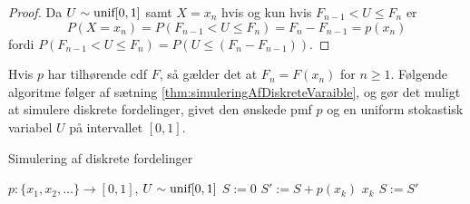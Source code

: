 \begin{proof}
    Da $U \sim \textnormal{unif}[0, 1]$ samt $X = x_n$ hvis og kun hvis $F_{n - 1} < U \leq F_n$ er
    \begin{equation*}
        P(X = x_n) = P(F_{n - 1} < U \leq F_n) = F_n - F_{n - 1} = p(x_n)
    \end{equation*}
    fordi $P(F_{n - 1} < U \leq F_n) = P\left(U \leq (F_n - F_{n - 1})\right)$.
\end{proof}

\begin{rem}
Hvis $p$ har tilhørende cdf $F$, så gælder det at $F_n = F(x_n)$ for $n \geq 1$. Følgende algoritme følger af sætning \ref{thm:simuleringAfDiskreteVaraible}, og gør det muligt at simulere diskrete fordelinger, givet den ønskede pmf $p$ og en uniform stokastisk variabel $U$ på intervallet $[0, 1]$.
\end{rem}

\begin{algorithm} 
\caption{Simulering af diskrete fordelinger}\label{alg:discreteSimulation} 
\begin{algorithmic}[1] 
 {$p: \{x_1, x_2, \ldots\} \rightarrow [0, 1]$, $U \sim \textnormal{unif}[0, 1]$}
    \State $S := 0$
        \State $S' := S + p(x_k)$ 
         \Return $x_k$
        \EndIf
        \State $S := S'$
    \EndFor
\EndProcedure
\end{algorithmic}
\end{algorithm} 



